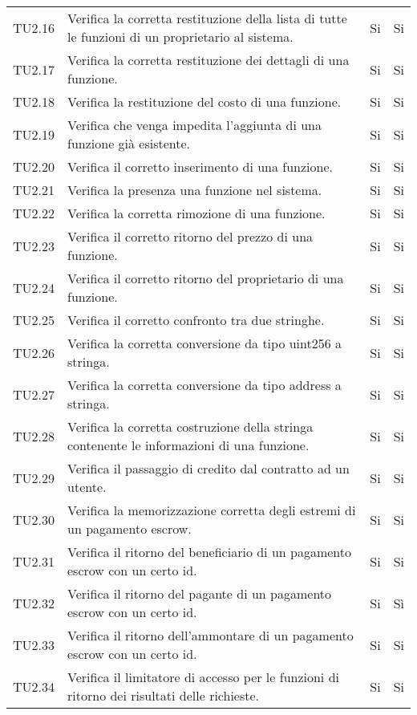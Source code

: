 \begin{longtable}{
		>{\centering}p{}
		>{}p{}
		>{\centering}p{}
		>{\centering}p{} }
TU2.16  &  Verifica la corretta restituzione della lista di tutte le funzioni di un proprietario al sistema. &
Si & Si \tabularnewline

TU2.17  &  Verifica la corretta restituzione dei dettagli di una funzione. &
Si & Si \tabularnewline

TU2.18  &  Verifica la restituzione del costo di una funzione. &
Si & Si \tabularnewline

TU2.19  &  Verifica che venga impedita l'aggiunta di una funzione già esistente. &
Si & Si \tabularnewline

TU2.20  &  Verifica il corretto inserimento di una funzione. &%
Si & Si \tabularnewline

TU2.21  &  Verifica la presenza una funzione nel sistema.	&
Si & Si \tabularnewline

TU2.22  &  Verifica la corretta rimozione di una funzione. &
Si & Si \tabularnewline

TU2.23  &  Verifica il corretto ritorno del prezzo di una funzione. &
Si & Si \tabularnewline

TU2.24  &  Verifica il corretto ritorno del proprietario di una funzione. &
Si & Si \tabularnewline

TU2.25  &  Verifica il corretto confronto tra due stringhe. &
Si & Si \tabularnewline

TU2.26  &  Verifica la corretta conversione da tipo uint256 a stringa. &
Si & Si \tabularnewline

TU2.27  &  Verifica la corretta conversione da tipo address a stringa. &
Si & Si \tabularnewline

TU2.28  &  Verifica la corretta costruzione della stringa contenente le informazioni di una funzione. &
Si & Si \tabularnewline

TU2.29  &  Verifica il passaggio di credito dal contratto ad un utente. & %
Si & Si \tabularnewline

TU2.30  &  Verifica la memorizzazione corretta degli estremi di un pagamento escrow. &
Si & Si \tabularnewline

TU2.31  &  Verifica il ritorno del beneficiario di un pagamento escrow con un certo id. &
Si & Si \tabularnewline

TU2.32  &  Verifica il ritorno del pagante di un pagamento escrow con un certo id.  &
Si & Sì \tabularnewline

TU2.33  &  Verifica il ritorno dell'ammontare di un pagamento escrow con un certo id.  &
Si & Si \tabularnewline

TU2.34  &  Verifica il limitatore di accesso per le funzioni di ritorno dei risultati delle richieste.	&
Si & Si \tabularnewline


\end{longtable}

